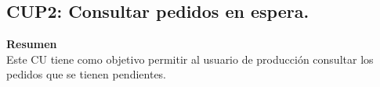 \documentclass[10pt,spanish]{article}
\begin{document}
		\newpage
		\subsection{CUP2: Consultar pedidos en espera.}

		\textbf{\large Resumen}{\large }\\
		{Este CU tiene como objetivo permitir al usuario de producción consultar los pedidos que se tienen pendientes.}\\
		{\large \par}

\end{document}
